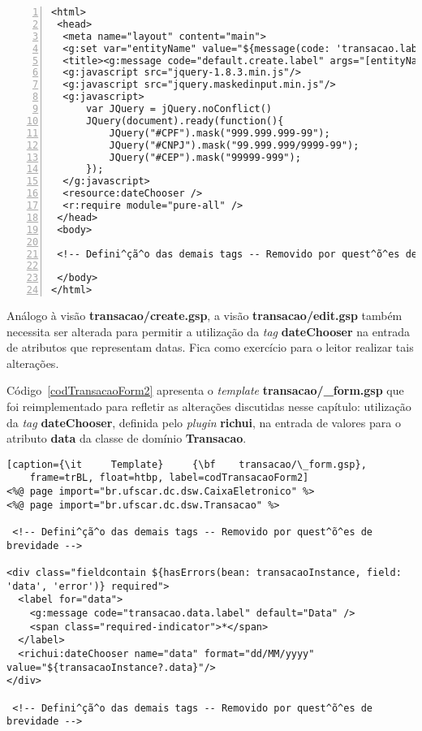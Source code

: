 \begin{lstlisting}[numbers=left,   caption=Visão   {\bf   transacao/create.gsp},
    frame=trBL, float=htbp, label=codTransacaoCreate2] 
<html>
 <head>
  <meta name="layout" content="main">
  <g:set var="entityName" value="${message(code: 'transacao.label', default: 'Transacao')}" />
  <title><g:message code="default.create.label" args="[entityName]" /></title>
  <g:javascript src="jquery-1.8.3.min.js"/>
  <g:javascript src="jquery.maskedinput.min.js"/> 
  <g:javascript>
      var JQuery = jQuery.noConflict()
      JQuery(document).ready(function(){
          JQuery("#CPF").mask("999.999.999-99");
          JQuery("#CNPJ").mask("99.999.999/9999-99");
          JQuery("#CEP").mask("99999-999");
      });
  </g:javascript>
  <resource:dateChooser />
  <r:require module="pure-all" />
 </head>
 <body>

 <!-- Defini^çã^o das demais tags -- Removido por quest^õ^es de brevidade --> 

 </body>
</html>
\end{lstlisting}

\begin{remark}
Análogo  à visão  {\bf transacao/create.gsp},  a visão  {\bf transacao/edit.gsp}
também  necessita ser  alterada para  permitir a  utilização da  {\it  tag} {\bf
  dateChooser}  na  entrada  de  atributos  que representam  datas.   Fica  como
exercício para o leitor realizar tais alterações. 
\end{remark}

\vspace{0.3cm}

\noindent  Código~\ref{codTransacaoForm2}   apresenta  o  {\it   template}  {\bf
  transacao/\_form.gsp}  que  foi  reimplementado  para refletir  as  alterações
discutidas nesse  capítulo: utilização da {\it tag}  {\bf dateChooser}, definida
pelo {\it plugin} {\bf richui}, na entrada de valores para o atributo {\bf data}
da classe de domínio {\bf Transacao}.  

\vspace{0.3cm}

\begin{lstlisting}[caption={\it     Template}     {\bf    transacao/\_form.gsp},
    frame=trBL, float=htbp, label=codTransacaoForm2] 
<%@ page import="br.ufscar.dc.dsw.CaixaEletronico" %>
<%@ page import="br.ufscar.dc.dsw.Transacao" %>

 <!-- Defini^çã^o das demais tags -- Removido por quest^õ^es de brevidade -->

<div class="fieldcontain ${hasErrors(bean: transacaoInstance, field: 'data', 'error')} required">
  <label for="data">
    <g:message code="transacao.data.label" default="Data" />
    <span class="required-indicator">*</span>
  </label>
  <richui:dateChooser name="data" format="dd/MM/yyyy" value="${transacaoInstance?.data}"/>
</div>

 <!-- Defini^çã^o das demais tags -- Removido por quest^õ^es de brevidade -->

\end{lstlisting}

